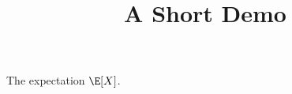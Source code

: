 \documentclass[article]{jss}
\title{A Short Demo}
\begin{document}
The expectation $\E[X]$.
\end{document}
